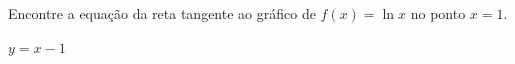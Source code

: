 \begin{ex}
  Encontre a equação da reta tangente ao gráfico de $f(x) = \ln x$ no ponto $x=1$.
\end{ex}
\begin{resp}
  $y = x-1$
\end{resp}





